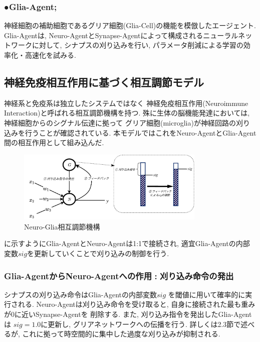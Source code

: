 \documentclass[a4paper, 9pt,twocolumn,dvipdfmx]{jsarticle}
\begin{document}
  \subsubsection*{●Glia-Agent;\,\,}
  神経細胞の補助細胞であるグリア細胞(Glia-Cell)の機能を模倣したエージェント.
  Glia-Agentは, Neuro-AgentとSynapse-Agentによって構成されるニューラルネットワークに対して,
  シナプスの刈り込みを行い, パラメータ削減による学習の効率化・高速化を試みる. 
  \vspace{2mm}
\subsection{神経免疫相互作用に基づく相互調節モデル}
神経系と免疫系は独立したシステムではなく
神経免疫相互作用(Neuroimmune Interaction)と呼ばれる相互調節機構を持つ.
殊に生体の脳機能発達においては, 神経細胞からのシグナル伝達に拠って
グリア細胞(microglia)が神経回路の刈り込みを行うことが確認されている.
本モデルではこれをNeuro-AgentとGlia-Agent間の相互作用として組み込んだ.
\vspace{-5mm}
\begin{figure}[H]
  \centering
  \includegraphics[width=9cm]{NewDeal.pdf}  
  \caption{Neuro-Glia相互調節機構}
  \label{fig:NeuroGlia}
\end{figure}
\vspace{-5mm}
に示すようにGlia-AgentとNeuro-Agentは1:1で接続され, 
 適宜Glia-Agentの内部変数$sig$を更新していくことで刈り込みの制御を行う.
 \vspace{1mm}
\subsubsection*{Glia-AgentからNeuro-Agentへの作用\,\,:\,\,刈り込み命令の発出}
シナプスの刈り込み命令はGlia-Agentの内部変数$sig$
を閾値に用いて確率的に実行される.
Neuro-Agentは刈り込み命令を受け取ると, 自身に接続された最も重みが0に近いSynapse-Agentを
削除する.
また, 刈り込み指令を発出したGlia-Agentは
$sig=1.0$に更新し, グリアネットワークへの伝播を行う.
詳しくは2.3節で述べるが, これに拠って時空間的に集中した過度な刈り込みが抑制される.
\end{document}
